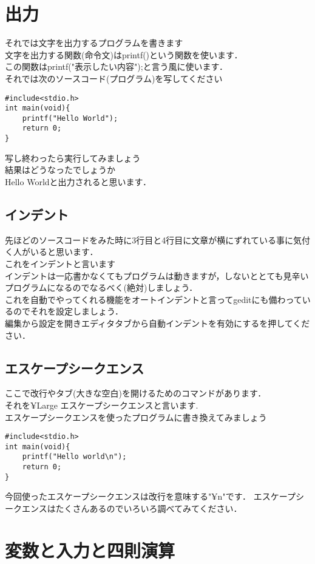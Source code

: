 \documentclass[a4j,titlepage,dvipdfmx]{jsarticle}   %
\begin{document}
\section{出力}
それでは文字を出力するプログラムを書きます\\
文字を出力する関数(命令文)はprintf()という関数を使います．\\
この関数はprintf("表示したい内容");と言う風に使います．\\
それでは次のソースコード(プログラム)を写してください\\
\begin{lstlisting}
#include<stdio.h>
int main(void){
	printf("Hello World");
	return 0;
}
\end{lstlisting}
写し終わったら実行してみましょう\\
結果はどうなったでしょうか\\
Hello Worldと出力されると思います．\\
\subsection{インデント}
先ほどのソースコードをみた時に3行目と4行目に文章が横にずれている事に気付く人がいると思います．\\
これをインデントと言います\\
インデントは一応書かなくてもプログラムは動きますが，しないととても見辛いプログラムになるのでなるべく(絶対)しましょう．\\
これを自動でやってくれる機能をオートインデントと言ってgeditにも備わっているのでそれを設定しましょう．\\
編集から設定を開きエディタタブから自動インデントを有効にするを押してください．
\subsection{エスケープシークエンス}
ここで改行やタブ(大きな空白)を開けるためのコマンドがあります．\\
それを{¥Large エスケープシークエンス}と言います.\\
エスケープシークエンスを使ったプログラムに書き換えてみましょう\\
\begin{lstlisting}
#include<stdio.h>
int main(void){
	printf("Hello world\n");
	return 0;
}
\end{lstlisting}
今回使ったエスケープシークエンスは改行を意味する"¥n"です．
エスケープシークエンスはたくさんあるのでいろいろ調べてみてください．
\section{変数と入力と四則演算}
\end{document}
